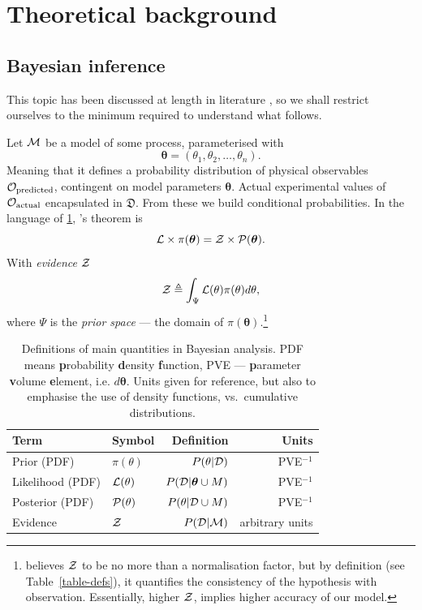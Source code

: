 \documentclass[usenatbib]{mnras}
\begin{document}
\section{Theoretical background}\label{sec:orge6061a4}

\subsection{Bayesian inference}\label{sec:org6b7d2fe}

This topic has been discussed at length in literature
\citep{jeffreys2010scientific}, so we shall restrict ourselves to the
minimum required to understand what follows.

Let \({\cal M}\) be a model of some process, parameterised with
\[\bm{\theta} = (\theta_{1}, \theta_{2}, \ldots ,
  \theta_{n}).\] Meaning that it defines a probability distribution of
physical observables ${\cal O}_\text{predicted}$, contingent on model
parameters \(\bm{\theta}\). Actual experimental values of
${\cal O}_\text{actual}$ encapsulated in \(\mathfrak{D}\). From these
we build conditional probabilities. In the language of
\cref{table-defs}, \citeauthor{1763}'s theorem is
\begin{equation}\label{eq:bayes} 
 {\cal L} \times \pi (\bm{\theta}) = {\cal Z}\times {\cal P} (\bm{\theta}).
\end{equation}
With \emph{evidence} \({\cal Z}\) 
\begin{equation}\label{eq:def-z}
 {\cal Z} \triangleq \int_{\Psi} {\cal L}(\theta) \pi(\theta) d\theta, 
\end{equation}
where \(\Psi\) is the \emph{prior space} --- the domain of 
\(\pi(\bm{\theta})\).\footnote{\Cite{jeffreys2010scientific} believes \({\cal Z}\) to be no more than a normalisation factor, but by definition (see Table~\vref{table-defs}), it quantifies the consistency of the hypothesis with  observation. Essentially,  higher \({\cal Z}\), implies higher accuracy of our model.}

\begin{table}
  \caption{Definitions of main quantities in Bayesian analysis. PDF means \textbf{p}robability \textbf{d}ensity \textbf{f}unction, PVE --- \textbf{p}arameter \textbf{v}olume \textbf{e}lement, i.e. \(d \bm{\theta}\). Units given for reference, but also to emphasise the use of density functions, vs.\ cumulative distributions.\label{table-defs}}
\centering
\begin{tabular}{llrr}
\textbf{\textbf{Term}} & \textbf{\textbf{Symbol}} & \textbf{\textbf{Definition}} & \textbf{\textbf{Units}}\\
\hline
Prior (PDF) & \(\pi(\theta)\) & \(P ( \theta  \vert {\cal D})\) & PVE\(^{-1}\)\\
Likelihood (PDF) & \({\cal L}(\theta)\) & \(P ( {\cal D} \vert \bm{\theta} \cup M)\) & PVE\(^{-1}\)\\
Posterior (PDF) & \({\cal P}(\theta)\) & \(P ( \theta \vert {\cal D} \cup M)\) & PVE\(^{-1}\)\\
Evidence & \({\cal Z}\) & \(P ( {\cal D} \vert {\cal M})\) & arbitrary units\\
\end{tabular}
\end{table}
\end{document}
